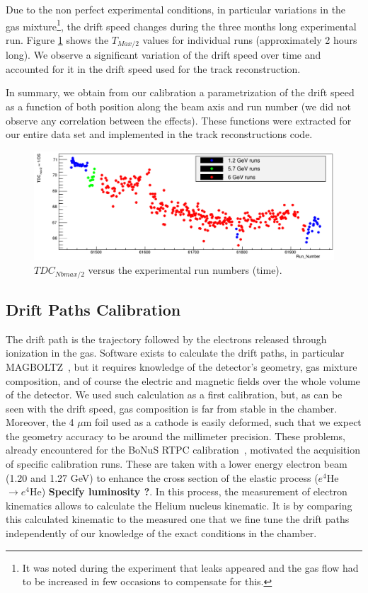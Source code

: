 \documentclass[twocolumn,showpacs,superscriptaddress,groupedaddress]{revtex4}
\begin{document}
Due to the non perfect experimental conditions, in particular variations in the 
gas mixture\footnote{It was noted during the experiment that leaks appeared
and the gas flow had to be increased in few occasions to compensate for this.}, 
the drift speed changes during the three months long experimental run.  
Figure \ref{fig:Drift_run_number_1} shows the $T_{Max/2}$ values for 
individual runs (approximately 2 hours long). We observe a significant 
variation of the drift speed over time and accounted for it in the drift 
speed used for the track reconstruction. 

In summary, we obtain from our calibration a parametrization of the drift speed 
as a function of both position along the beam axis and run number (we did not 
observe any correlation between the effects). These 
functions were extracted for our entire data set and implemented in the 
track reconstructions code.

\begin{figure}[tb]
\hspace*{-1.8cm}
\includegraphics[scale=0.26]{fig/Drift_run_number_1.png}
\caption{$TDC_{Nbmax/2}$ versus the experimental run numbers (time).  } 
\label{fig:Drift_run_number_1}
\end{figure}

   
\subsection{Drift Paths Calibration}

The drift path is the trajectory followed by the electrons released through 
ionization in the gas. Software exists to calculate the drift paths, in particular
MAGBOLTZ~\cite{MAGBOLTZ}, but it requires knowledge of the detector's 
geometry, gas mixture composition, and of course the electric and magnetic 
fields over the whole volume of the detector. We used such calculation as a 
first calibration, but, 
as can be seen with the drift speed, gas composition is far from stable in the 
chamber. Moreover, the 4 $\mu$m foil used as a cathode is easily deformed, such
that we expect the geometry accuracy to be around the millimeter precision. 
These problems, already 
encountered for the BoNuS RTPC calibration~\cite{BONUS-NIM}, motivated the 
acquisition of specific calibration runs. These are taken with a lower energy 
electron beam (1.20 and 1.27 GeV) to enhance the cross section of the elastic 
process ($e^{4}$He$\rightarrow e^{4}$He)
{\bf \color{red} Specify luminosity ?}. In this process, the measurement of
electron kinematics allows to calculate the Helium nucleus kinematic. It is
by comparing this calculated kinematic to the measured one that we fine tune
the drift paths independently of our knowledge of the exact conditions in the 
chamber.
\end{document}
